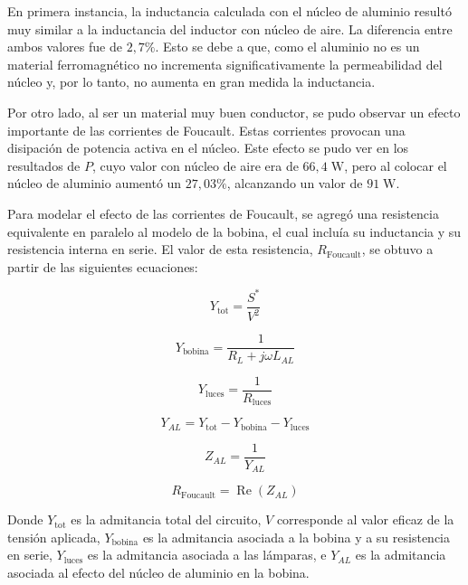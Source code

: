 En primera instancia, la inductancia calculada con el núcleo de aluminio resultó muy similar a la inductancia del inductor con núcleo de aire. La diferencia entre ambos valores fue de \(2{,}7\%\). Esto se debe a que, como el aluminio no es un material ferromagnético no incrementa significativamente la permeabilidad del núcleo y, por lo tanto, no aumenta en gran medida la inductancia.

Por otro lado, al ser un material muy buen conductor, se pudo observar un efecto importante de las corrientes de Foucault. Estas corrientes provocan una disipación de potencia activa en el núcleo. Este efecto se pudo ver en los resultados de \(P\), cuyo valor con núcleo de aire era de \(66{,}4 \; \mathrm{W}\), pero al colocar el núcleo de aluminio aumentó un \(27{,}03\%\), alcanzando un valor de \(91 \; \mathrm{W}\).

Para modelar el efecto de las corrientes de Foucault, se agregó una resistencia equivalente en paralelo al modelo de la bobina, el cual incluía su inductancia y su resistencia interna en serie. El valor de esta resistencia, \(R_{\text{Foucault}}\), se obtuvo a partir de las siguientes ecuaciones:

\begin{equation}
Y_{\text{tot}}=\frac{S^*}{V^2}
\label{eq:Ytot}
\end{equation}

\begin{equation}
Y_{\text{bobina}}=\frac{1}{R_L+j\omega L_{AL}}
\label{eq:Ybobina}
\end{equation}

\begin{equation}
Y_{\text{luces}}=\frac{1}{R_{\text{luces}}}
\label{eq:Yluces}
\end{equation}

\begin{equation}
Y_{AL}=Y_{\text{tot}}-Y_{\text{bobina}}-Y_{\text{luces}}
\label{eq:YAL}
\end{equation}

\begin{equation}
Z_{AL}=\frac{1}{Y_{AL}}
\label{eq:ZAL}
\end{equation}

\begin{equation}
R_{\text{Foucault}}=\operatorname{Re}(Z_{AL})
\label{eq:RFoucault}
\end{equation}


Donde \(Y_{\text{tot}}\) es la admitancia total del circuito, \(V\) corresponde al valor eficaz de la tensión aplicada, \(Y_{\text{bobina}}\) es la admitancia asociada a la bobina y a su resistencia en serie, \(Y_{\text{luces}}\) es la admitancia asociada a las lámparas, e \(Y_{AL}\) es la admitancia asociada al efecto del núcleo de aluminio en la bobina.

